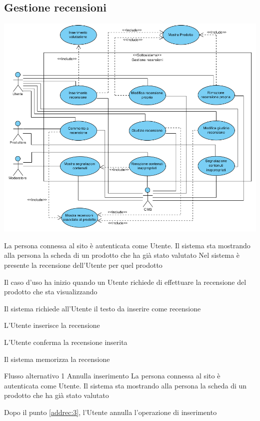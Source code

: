 \subsection{Gestione recensioni}
\begin{center}
   \includegraphics[width=\textwidth]{assets/visualParadigm/cu/GestioneRecensioni}
\end{center}
{}
{La persona connessa al sito è autenticata come Utente. Il sistema sta mostrando alla persona la scheda di un prodotto che ha già stato valutato}
{Nel sistema è presente la recensione dell'Utente per quel prodotto}
{\begin{enumCU}
	\item Il caso d'uso ha inizio quando un Utente richiede di effettuare la recensione del prodotto che sta visualizzando
	\item Il sistema richiede all'Utente il testo da inserire come recensione
	\item L'Utente inserisce la recensione\label{addrec:3}
	\item L'Utente conferma la recensione inserita
	\item Il sistema memorizza la recensione
\end{enumCU}}
%
{Flusso alternativo 1}%
{Annulla inserimento}%
{La persona connessa al sito è autenticata come Utente. Il sistema sta mostrando alla persona la scheda di un prodotto che ha già stato valutato}%
{\postNulle}%
{\begin{enumCU}
		\item Dopo il punto \ref{addrec:3}, l'Utente annulla l'operazione di inserimento
	\end{enumCU}}%

